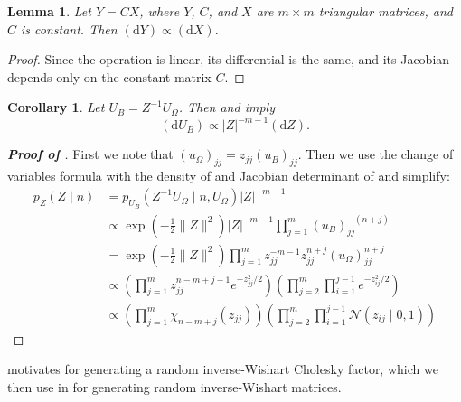 \documentclass[12pt,a4paper,reqno]{amsart}
\numberwithin{equation}{section}
\newtheorem{lemma}{Lemma}[section]
\newtheorem{corollary}{Corollary}[section]
\renewcommand{\det}[1]{\left| {#1} \right|}
\newcommand{\dmeasure}[1]{\left(\dd{#1}\right)}
\newcommand{\dd}[1]{\mathrm{d}{#1}}
\begin{document}
\begin{lemma}\label{lem:trimuldetjac}
    Let $Y = C X$, where $Y$, $C$, and $X$ are $m \times m$ triangular matrices, and $C$ is constant.
    Then $\dmeasure{Y} \propto \dmeasure{X}$.
\end{lemma}
\begin{proof}
    Since the operation is linear, its differential is the same, and its Jacobian depends only on the constant matrix $C$.
\end{proof}

\begin{corollary}
    Let $U_B = Z^{-1} U_\Omega$.
    Then  and  imply
    \begin{equation}\label{eq:trildivdetjac}
        \dmeasure{U_B} \propto \det{Z}^{-m-1} \dmeasure{Z}.
    \end{equation}
\end{corollary}

\begin{proof}[\textbf{Proof of }]
    First we note that $(u_\Omega)_{jj} = z_{jj} (u_B)_{jj}$.
    Then we use the change of variables formula with the density of  and Jacobian determinant of  and simplify:
    \begin{align*}
        p_Z(Z \mid n) & = p_{U_B}(Z^{-1} U_\Omega \mid n, U_\Omega) \det{Z}^{-m-1}                                                                         \\
                      & \propto \exp\left(-\frac{1}{2}\lVert Z \rVert^2\right) \det{Z}^{-m-1} \prod_{j=1}^m (u_B)_{jj}^{-(n+j)}                            \\
                      & = \exp\left(-\frac{1}{2}\lVert Z \rVert^2\right) \prod_{j=1}^m z_{jj}^{-m-1} z_{jj}^{n+j} (u_\Omega)_{jj}^{n+j}                    \\
                      & \propto \left(\prod_{j=1}^m z_{jj}^{n-m+j-1} e^{-z_{jj}^2/2}\right) \left(\prod_{j=2}^m \prod_{i=1}^{j-1} e^{-z_{ij}^2/2}\right)   \\
                      & \propto \left(\prod_{j=1}^m \chi_{n-m+j}(z_{jj})\right) \left(\prod_{j=2}^m \prod_{i=1}^{j-1} \mathcal{N}(z_{ij} \mid 0, 1)\right)
    \end{align*}
\end{proof}

 motivates  for generating a random inverse-Wishart Cholesky factor, which we then use in  for generating random inverse-Wishart matrices.
\end{document}
